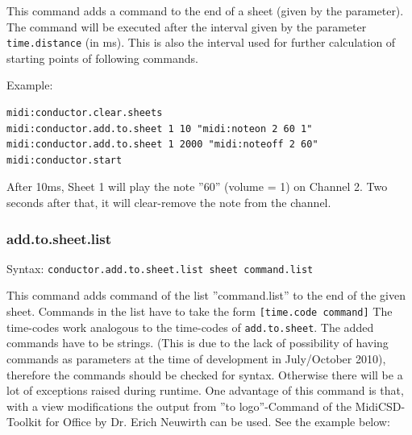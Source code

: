 \documentclass[10pt,a4paper]{article}
\begin{document}
This command adds a command to the end of a sheet (given by the parameter). The command
will be executed after the interval given by the parameter \lstinline|time.distance| (in ms).
This is also the interval used for further calculation of starting points of following commands.

Example: 
\begin{lstlisting}[language=Logo]
midi:conductor.clear.sheets
midi:conductor.add.to.sheet 1 10 "midi:noteon 2 60 1"
midi:conductor.add.to.sheet 1 2000 "midi:noteoff 2 60"
midi:conductor.start
\end{lstlisting}

After 10ms, Sheet 1 will play the note ''60'' (volume = 1) on Channel 2. Two seconds
after that, it will clear-remove the note from the channel. 


\subsubsection{add.to.sheet.list}
Syntax: \lstinline|conductor.add.to.sheet.list sheet command.list|

This command adds command of the list ''command.list'' to the end of the given
sheet. Commands in the list have to take the form \lstinline|[time.code command]|
The time-codes work analogous to the time-codes of \lstinline|add.to.sheet|. The added
commands have to be strings. (This is due to the lack of possibility of having
commands as parameters at the time of development in July/October 2010), therefore the
commands should be checked for syntax. Otherwise there will be a lot of exceptions raised
during runtime. 
One advantage of this command is that, with a view modifications the output from 
''to logo''-Command of the MidiCSD-Toolkit for Office \cite{MidiCSD} by Dr. Erich Neuwirth
can be used. 
See the example below: 
\end{document}
